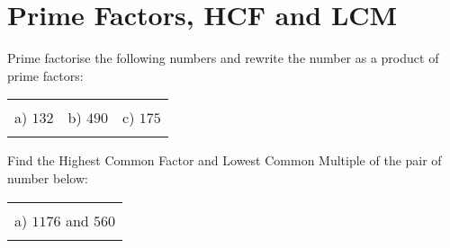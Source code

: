 \documentclass[12pt]{article}
\begin{document}
\section{Prime Factors, HCF and LCM}
Prime factorise the following numbers and rewrite the number as a product of prime factors:
\begin{table}[h!]
\centering
\begin{tabular}{c c c}
\hspace{4cm} & \hspace{4cm} & \hspace{4cm} \\
a) $132$ & b) $490$ & c) $175$\\ \\
\end{tabular}
\end{table}
\newline
Find the Highest Common Factor and Lowest Common Multiple of the pair of number below:
\begin{table}[h!]
\centering
\begin{tabular}{c}
\hspace{4cm}\\
a) $1176$ and $560$\\ \\
\end{tabular}
\end{table}
\newline
\end{document}
